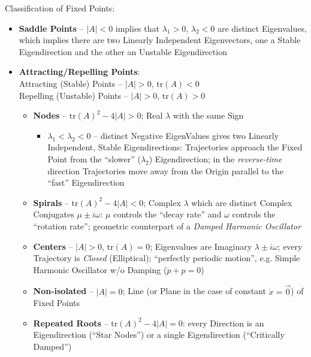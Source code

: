 Classification of Fixed Points:
\begin{itemize}
  \item \textbf{Saddle Points} -- $|A| < 0$ implies that $\lambda_1 > 0$,
    $\lambda_2 < 0$ are distinct Eigenvalues, which implies there are two
    Linearly Independent Eigenvectors, one a Stable Eigendirection and the
    other an Unstable Eigendirection
  \item \textbf{Attracting/Repelling Points}: \\
    Attracting (Stable) Points -- $|A| > 0$, $\mathrm{tr}(A) < 0$ \\
    Repelling (Unstable) Points -- $|A| > 0$, $\mathrm{tr}(A) > 0$
    \begin{itemize}
      \item \textbf{Nodes} -- $\mathrm{tr}(A)^2 - 4|A| > 0$; Real $\lambda$
        with the same Sign
        \begin{itemize}
          \item $\lambda_1 < \lambda_2 < 0$ -- distinct Negative EigenValues
            gives two Linearly Independent, Stable Eigendirections:
            Trajectories approach the Fixed Point from the ``slower''
            ($\lambda_2$) Eigendirection; in the \emph{reverse-time} direction
            Trajectories move away from the Origin parallel to the ``fast''
            Eigendirection
        \end{itemize}
      \item \textbf{Spirals} -- $\mathrm{tr}(A)^2 - 4|A| < 0$; Complex
        $\lambda$ which are distinct Complex Conjugates $\mu \pm{i\omega}$:
        $\mu$ controls the ``decay rate'' and $\omega$ controls the ``rotation
        rate''; geometric counterpart of a \emph{Damped Harmonic Oscillator}
      \item \textbf{Centers} -- $|A| > 0$, $\mathrm{tr}(A) = 0$; Eigenvalues
        are Imaginary $\lambda \pm i\omega$; every Trajectory is \emph{Closed}
        (Elliptical); ``perfectly periodic motion'', e.g. Simple Harmonic
        Oscillator w/o Damping ($\ddot{p} + p = 0$)
      \item \textbf{Non-isolated} -- $|A| = 0$; Line (or Plane in the case of
        constant $\dot{x} = \vec{0}$) of Fixed Points
      \item \textbf{Repeated Roots} -- $\mathrm{tr}(A)^2 - 4|A| = 0$: every
        Direction is an Eigendirection (``Star Nodes'') or a single
        Eigendirection (``Critically Damped'')
    \end{itemize}
\end{itemize}

